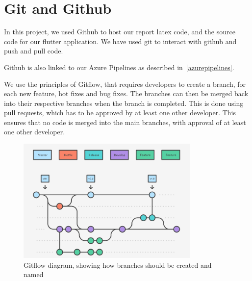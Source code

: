 \section{Git and Github}
In this project, we used Github to host our report latex code, and the source code for our flutter application.
We have used git to interact with github and push and pull code. 

Github is also linked to our Azure Pipelines as described in~\autoref{azurepipelines}.

We use the principles of Gitflow, that requires developers to create a branch, for each new feature, hot fixes and bug fixes. 
The branches can then be merged back into their respective branches when the branch is completed.
This is done using pull requests, which has to be approved by at least one other developer.
This ensures that no code is merged into the main branches, with approval of at least one other developer.

\begin{figure}[H]
    \includegraphics[width=0.8\textwidth]{images/GitFlow.png}
    \caption{Gitflow diagram, showing how branches should be created and named}
    \label{Gitflow}
\end{figure}

